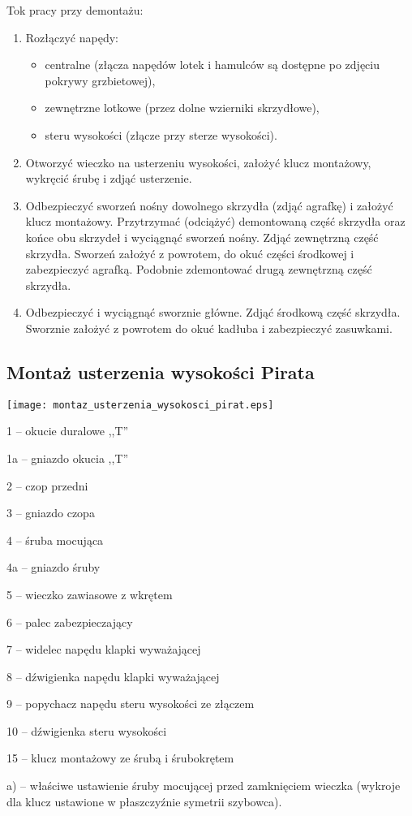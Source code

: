 \documentclass{article}
\newenvironment{packed_enum}{
\begin{enumerate}
  \setlength{\itemsep}{1pt}
  \setlength{\parskip}{0pt}
  \setlength{\parsep}{0pt}
}{\end{enumerate}}
\begin{document}
\newpage
\noindent
Tok pracy przy demontażu:
\begin{enumerate}
    \item Rozłączyć napędy:
    \begin{itemize}
        \item centralne (złącza napędów lotek i hamulców są dostępne po
             zdjęciu pokrywy grzbietowej),
        \item zewnętrzne lotkowe (przez dolne wzierniki skrzydłowe),
        \item steru wysokości (złącze przy sterze wysokości).
    \end{itemize}
    \item Otworzyć wieczko na usterzeniu wysokości, założyć klucz montażowy,
         wykręcić śrubę i zdjąć usterzenie.
    \item Odbezpieczyć sworzeń nośny dowolnego skrzydła (zdjąć agrafkę) i
         założyć klucz montażowy. Przytrzymać (odciążyć) demontowaną część
         skrzydła oraz końce obu skrzydeł i wyciągnąć sworzeń nośny. Zdjąć
         zewnętrzną część skrzydła. Sworzeń założyć z powrotem, do okuć części
         środkowej i zabezpieczyć agrafką. Podobnie zdemontować drugą
         zewnętrzną część skrzydła.
    \item Odbezpieczyć i wyciągnąć sworznie główne. Zdjąć środkową część
         skrzydła. Sworznie założyć z powrotem do okuć kadłuba i zabezpieczyć
         zasuwkami.
\end{enumerate}

\newpage
\subsection{Montaż usterzenia wysokości Pirata}

\begin{center}
\texttt{[image: montaz\_usterzenia\_wysokosci\_pirat.eps]}
\end{center}

\begin{packed_enum}
\item[1] -- okucie duralowe ,,T''
\item[1a] -- gniazdo okucia ,,T''
\item[2] -- czop przedni
\item[3] -- gniazdo czopa
\item[4] -- śruba mocująca
\item[4a] -- gniazdo śruby
\item[5] -- wieczko zawiasowe z wkrętem
\item[6] -- palec zabezpieczający
\item[7] -- widelec napędu klapki wyważającej
\item[8] -- dźwigienka napędu klapki wyważającej
\item[9] -- popychacz napędu steru wysokości ze złączem
\item[10] -- dźwigienka steru wysokości
\item[15] -- klucz montażowy ze śrubą i śrubokrętem
\item[a)] -- właściwe ustawienie śruby mocującej przed zamknięciem
wieczka (wykroje dla klucz ustawione w płaszczyźnie symetrii
szybowca).
\end{packed_enum}
\end{document}
